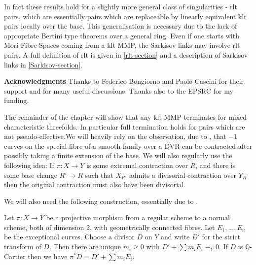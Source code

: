 	In fact these results hold for a slightly more general class of singularities - rlt pairs, which are essentially pairs which are replaceable by linearly equivalent klt pairs locally over the base. This generalisation is necessary due to the lack of appropriate Bertini type theorems over a general ring. Even if one starts with Mori Fibre Spaces coming from a klt MMP, the Sarkisov links may involve rlt pairs. A full definition of rlt is given in \autoref{rlt-section} and a description of Sarkisov links in \autoref{Sarkisov-section}.
	
	\textbf{Acknowledgments}
	Thanks to Federico Bongiorno and Paolo Cascini for their support and for many useful discussions. Thanks also to the EPSRC for my funding.	
	

	The remainder of the chapter will show that any klt MMP terminates for mixed characteristic threefolds. In particular full termination holds for pairs which are not pseudo-effective.We will heavily rely on the observation, due to \cite{katsura1985elliptic}, that $-1$ curves on the special fibre of a smooth family over a DVR can be contracted after possibly taking a finite extension of the base. We will also regularly use the following idea: If $\pi:X \to Y$ is some extremal contraction over $R$, and there is some base change $R' \to R$ such that $X_{R'}$ admits a divisorial contraction over $Y_{R'}$ then the original contraction must also have been divisorial.

	We will also need the following construction, essentially due to \cite{mumford1961topology}.
	
	\begin{lemma}
		
		Let $\pi:X \to Y$ be a projective morphism from a regular scheme to a normal scheme, both of dimension $2$, with geometrically connected fibres. Let $E_{1},...,E_{n}$ be the exceptional curves. Choose a divisor $D$ on $Y$ and write $D'$ for the strict transform of $D$. Then there are unique $m_{i} \geq 0$ with $D'+\sum m_{i}E_{i} \equiv_{Y} 0$. If $D$ is $\mathbb{Q}$-Cartier then we have $\pi^{*}D= D'+\sum m_{i}E_{i}$.
		
	\end{lemma}
	
